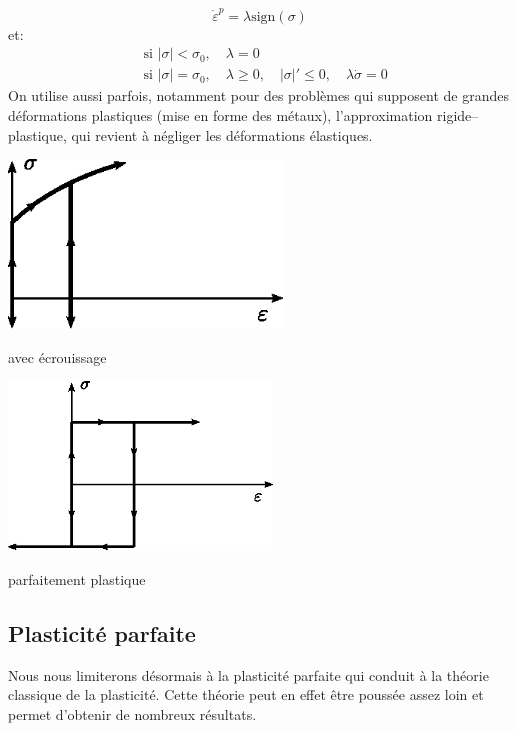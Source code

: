 \begin{equation}
    \dot{\varepsilon}^p = \lambda \text{sign} (\sigma)
    \label{eq:Ch10-007}
\end{equation}
et:
\begin{equation}
    \begin{aligned}
        &\text{si } |\sigma| < \sigma_0, \quad \lambda = 0 \\
        &\text{si } |\sigma| = \sigma_0, \quad \lambda \geq 0, \quad |\sigma|' \leq 0, \quad \lambda \dot{\sigma} = 0
    \end{aligned}
    \label{eq:Ch10-008}
\end{equation}
On utilise aussi parfois, notamment pour des problèmes qui supposent de grandes déformations plastiques (mise en forme des métaux), l'approximation rigide--plastique, qui revient à négliger les déformations élastiques. 
\begin{multicols}{2}
    \begin{center}
        \includegraphics[height=4.5cm]{../images/T1_Ch10-05}

        avec écrouissage
    \end{center}
    \begin{center}
        \includegraphics[height=4.5cm]{../images/T1_Ch10-06}

        parfaitement plastique
    \end{center}
\end{multicols}

\subsection{Plasticité parfaite}
Nous nous limiterons désormais à la plasticité parfaite qui conduit à la théorie classique de la plasticité.
Cette théorie peut en effet être poussée assez loin et permet d'obtenir de nombreux résultats. 

